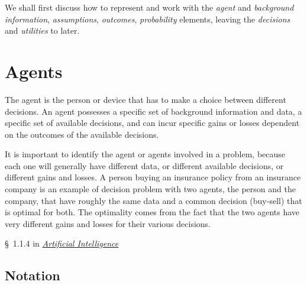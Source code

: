 \documentclass[
  a4paper,
  DIV=11,
  numbers=noendperiod,
  oneside]{scrreprt}
\begin{document}
We shall first discuss how to represent and work with the \emph{agent}
and \emph{background information}, \emph{assumptions}, \emph{outcomes},
\emph{probability} elements, leaving the \emph{decisions} and
\emph{utilities} to later.

\hypertarget{agents}{%
\section{Agents}\label{agents}}

The agent is the person or device that has to make a choice between
different decisions. An agent possesses a specific set of background
information and data, a specific set of available decisions, and can
incur specific gains or losses dependent on the outcomes of the
available decisions.


It is important to identify the agent or agents involved in a problem,
because each one will generally have different data, or different
available decisions, or different gains and losses. A person buying an
insurance policy from an insurance company is an example of decision
problem with two agents, the person and the company, that have roughly
the same data and a common decision (buy-sell) that is optimal for both.
The optimality comes from the fact that the two agents have very
different gains and losses for their various decisions.

\begin{tcolorbox}[enhanced jigsaw, bottomrule=.15mm, leftrule=.75mm, opacitybacktitle=0.6, breakable, toptitle=1mm, coltitle=black, title={\faIcon{book-open} Reading}, rightrule=.15mm, left=2mm, colframe=quarto-callout-caution-color-frame, bottomtitle=1mm, arc=.35mm, titlerule=0mm, toprule=.15mm, opacityback=0, colback=white, colbacktitle=quarto-callout-caution-color!10!white]

§~1.1.4 in
\href{https://hvl.instructure.com/courses/25074/modules/items/660089}{\emph{Artificial
Intelligence}}

\end{tcolorbox}

\hypertarget{notation}{%
\subsection{Notation}\label{notation}}
\end{document}
